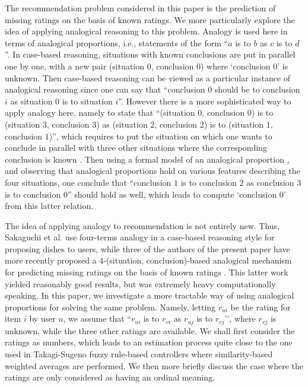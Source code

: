 \documentclass[conference]{IEEEtran}
\begin{document}
The recommendation problem considered in this paper is the prediction of
missing ratings on the basis of known ratings. We more particularly explore the
idea of applying analogical reasoning to this problem.
Analogy is used here in terms of analogical proportions, i.e., statements of
the form ``$a$ is to $b$ as $c$ is to $d$''. In case-based reasoning,
situations with known conclusions are put in parallel one by one, with a new pair (situation $0$,
conclusion $0$) where `conclusion $0$' is unknown. Then case-based reasoning
can be viewed as a particular instance of analogical reasoning since one
can say that ``conclusion $0$ should be to conclusion $i$ as situation $0$ is
to situation $i$''. However there is a more sophisticated way to apply analogy
here, namely to state  that ``(situation $0$, conclusion $0$) is to (situation
$3$, conclusion $3$) as (situation $2$, conclusion $2$) is to (situation $1$,
conclusion $1$)'', which requires to put the situation on which one wants to
conclude in parallel with three other situations where the corresponding
conclusion is known \cite{DPRManta}. Then using a formal model of an analogical
proportion \cite{MicPraNAFIPS2008,PraRicLU2013}, and observing that analogical
proportions hold on various features describing the four situations, one
conclude that ``conclusion $1$ is to conclusion $2$ as conclusion $3$ is to
conclusion $0$'' should hold as well, which leads to compute `conclusion $0$'
from this latter relation.

The idea of applying analogy to recommendation is not entirely new. Thus,
Sakaguchi et al. \cite{Takagi2011} use four-terms analogy in a case-based reasoning
style for proposing dishes to users, while three of the authors of the present
paper have more recently proposed a  4-(situation, conclusion)-based analogical
mechanism for predicting missing ratings on the basis of known ratings
\cite{HugPR15}. This latter work yielded reasonably good results, but was
extremely heavy computationally speaking. In this paper, we investigate a
more tractable way of using analogical proportions for solving the same
problem. Namely, letting $r_{ui}$ be the rating for item $i$ by user $u$, we
assume that ``$r_{ui}$ is to $r_{vi}$ as $r_{uj}$ is to $r_{vj}$’’, where
$r_{vj}$ is unknown, while the three other ratings are available. We shall first
consider the ratings as numbers, which leads to an estimation process quite close
to the one used in Takagi-Sugeno fuzzy rule-based controllers \cite{TS85} where
similarity-based weighted averages are performed. We then more briefly discuss
the case where the ratings are only considered as having an ordinal meaning.
\end{document}
